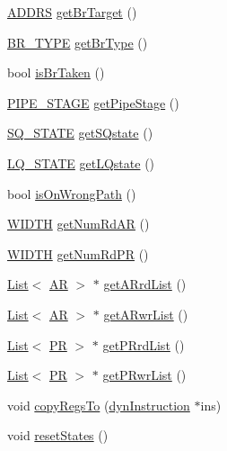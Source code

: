\begin{DoxyCompactItemize}
\item 
\hyperlink{global_2global_8h_a7ea74bb9ffd2e4d41550ae2383dd25bc}{ADDRS} \hyperlink{classdynInstruction_a50af30c57eb9ad1c546c4105db30fae4}{getBrTarget} ()
\item 
\hyperlink{global_2global_8h_a6e7345a10544e77c7dfe6c4e5cb3ec97}{BR\_\-TYPE} \hyperlink{classdynInstruction_a3918eb83344b5343d06e0925cccd96a6}{getBrType} ()
\item 
bool \hyperlink{classdynInstruction_a81de1dc10cdabcb8683a0b586b36144b}{isBrTaken} ()
\item 
\hyperlink{global_2global_8h_a015eb90e0de9f16e87bd149d4b9ce959}{PIPE\_\-STAGE} \hyperlink{classdynInstruction_aeb07269dfde7d142e72e13cda8060c29}{getPipeStage} ()
\item 
\hyperlink{global_2global_8h_af9e953470c71a91625fe1fc66f2dc49b}{SQ\_\-STATE} \hyperlink{classdynInstruction_a6160b96ca670a4c15a3fa81b0d54dcd4}{getSQstate} ()
\item 
\hyperlink{global_2global_8h_a49734aedeaf1d3f1c93c4778b3b62205}{LQ\_\-STATE} \hyperlink{classdynInstruction_a500260c0b3b35828bd0c678c4d5eb16a}{getLQstate} ()
\item 
bool \hyperlink{classdynInstruction_a9e5d4f7401d24394fcc9b77d818798b6}{isOnWrongPath} ()
\item 
\hyperlink{global_2global_8h_a6fa2e24b8a418fa215e183264cbea3aa}{WIDTH} \hyperlink{classdynInstruction_a73d8b75f5c68a4cb2a7f434d4b8d4143}{getNumRdAR} ()
\item 
\hyperlink{global_2global_8h_a6fa2e24b8a418fa215e183264cbea3aa}{WIDTH} \hyperlink{classdynInstruction_ad7fa2d930aa5ad7836d2c50c1ada3faa}{getNumRdPR} ()
\item 
\hyperlink{classList}{List}$<$ \hyperlink{global_2global_8h_a735ca3cb7fa17e60af6701a846722516}{AR} $>$ $\ast$ \hyperlink{classdynInstruction_abdbaf4c07e390bbdaaed41a983774538}{getARrdList} ()
\item 
\hyperlink{classList}{List}$<$ \hyperlink{global_2global_8h_a735ca3cb7fa17e60af6701a846722516}{AR} $>$ $\ast$ \hyperlink{classdynInstruction_aeba50fabf115b7f60ce7201df044201c}{getARwrList} ()
\item 
\hyperlink{classList}{List}$<$ \hyperlink{global_2global_8h_a54dcae2ba04c76c12afe113b706bd4dc}{PR} $>$ $\ast$ \hyperlink{classdynInstruction_a82afd5173ddfd7a7654f28565263f1a2}{getPRrdList} ()
\item 
\hyperlink{classList}{List}$<$ \hyperlink{global_2global_8h_a54dcae2ba04c76c12afe113b706bd4dc}{PR} $>$ $\ast$ \hyperlink{classdynInstruction_a40d9f8a39500558a4dea5d41ce5d6442}{getPRwrList} ()
\item 
void \hyperlink{classdynInstruction_ad817b69f51a6c82fd7b9a13a9ab1b62e}{copyRegsTo} (\hyperlink{classdynInstruction}{dynInstruction} $\ast$ins)
\item 
void \hyperlink{classdynInstruction_a9d4e4bce20dd4c1fd4d85270d828550e}{resetStates} ()
\end{DoxyCompactItemize}


